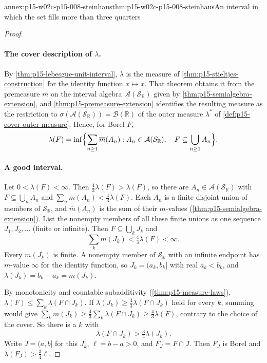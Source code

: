 \begin{annexitem}{annex:p15-w02c-p15-008-steinhaus}{thm:p15-w02c-p15-008-steinhaus}{An interval in which the set fills more than three quarters}
\begin{proof}
\paragraph{The cover description of \(\lambda\).}
By \cref{thm:p15-lebesgue-unit-interval}, \(\lambda\) is the measure of
\cref{thm:p15-stieltjes-construction} for the identity function \(x\mapsto x\). That theorem
obtains it from the premeasure \(\overline m\) on the interval algebra
\(\mathcal A(\mathcal S_{\mathbb R})\) given by
\cref{thm:p15-semialgebra-extension}, and
\cref{thm:p15-premeasure-extension} identifies the resulting measure as
the restriction to \(\sigma(\mathcal A(\mathcal S_{\mathbb R}))
=\mathcal B(\mathbb R)\) of the outer measure \(\lambda^*\) of
\cref{def:p15-cover-outer-measure}. Hence, for Borel \(F\),
\[
 \lambda(F)=\inf\Bigl\{\sum_{n\geq1}\overline m(A_n):
           A_n\in\mathcal A(\mathcal S_{\mathbb R}),\quad
           F\subseteq\bigcup_{n\geq1}A_n\Bigr\}.
\]

\paragraph{A good interval.}
Let \(0<\lambda(F)<\infty\). Then \(\tfrac43\lambda(F)>\lambda(F)\), so
there are \(A_n\in\mathcal A(\mathcal S_{\mathbb R})\) with
\(F\subseteq\bigcup_nA_n\) and
\(\sum_n\overline m(A_n)<\tfrac43\lambda(F)\). Each \(A_n\) is a finite
disjoint union of members of \(\mathcal S_{\mathbb R}\), and
\(\overline m(A_n)\) is the sum of their \(m\)-values
(\cref{thm:p15-semialgebra-extension}). List the nonempty members of all
these finite unions as one sequence \(J_1,J_2,\ldots\) (finite or
infinite). Then \(F\subseteq\bigcup_kJ_k\) and
\[
 \sum_k m(J_k)<\tfrac43\lambda(F)<\infty .
\]
Every \(m(J_k)\) is finite. A nonempty member of
\(\mathcal S_{\mathbb R}\) with an infinite endpoint has \(m\)-value
\(\infty\) for the identity function, so \(J_k=(a_k,b_k]\) with real
\(a_k<b_k\), and \(\lambda(J_k)=b_k-a_k=m(J_k)\).

By monotonicity and countable subadditivity
(\cref{thm:p15-measure-laws}),
\(\lambda(F)\leq\sum_k\lambda(F\cap J_k)\). If
\(\lambda(J_k)\geq\tfrac43\lambda(F\cap J_k)\) held for every \(k\),
summing would give
\(\sum_km(J_k)\geq\tfrac43\sum_k\lambda(F\cap J_k)\geq\tfrac43\lambda(F)\),
contrary to the choice of the cover. So there is a \(k\) with
\[
 \lambda(F\cap J_k)>\tfrac34\lambda(J_k).
\]
Write \(J=(a,b]\) for this \(J_k\), \(\ell=b-a>0\), and
\(F_J=F\cap J\). Then \(F_J\) is Borel and \(\lambda(F_J)>\tfrac34\ell\).


\end{proof}
\end{annexitem}
